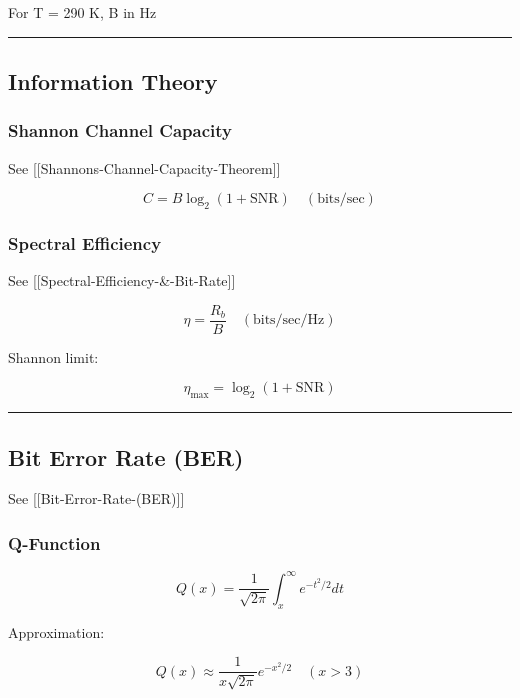 For T = 290 K, B in Hz

\begin{center}\rule{0.5\linewidth}{0.5pt}\end{center}

\subsection{\texorpdfstring{ Information
Theory}{ Information Theory}}\label{information-theory}

\subsubsection{Shannon Channel Capacity}\label{shannon-channel-capacity}

See {[}{[}Shannon\textquotesingle s-Channel-Capacity-Theorem{]}{]}

\[
C = B \log_2(1 + \text{SNR}) \quad (\text{bits/sec})
\]

\subsubsection{Spectral Efficiency}\label{spectral-efficiency}

See {[}{[}Spectral-Efficiency-\&-Bit-Rate{]}{]}

\[
\eta = \frac{R_b}{B} \quad (\text{bits/sec/Hz})
\]

Shannon limit:

\[
\eta_{\max} = \log_2(1 + \text{SNR})
\]

\begin{center}\rule{0.5\linewidth}{0.5pt}\end{center}

\subsection{\texorpdfstring{ Bit Error Rate
(BER)}{ Bit Error Rate (BER)}}\label{bit-error-rate-ber}

See {[}{[}Bit-Error-Rate-(BER){]}{]}

\subsubsection{Q-Function}\label{q-function}

\[
Q(x) = \frac{1}{\sqrt{2\pi}} \int_x^\infty e^{-t^2/2} dt
\]

Approximation:

\[
Q(x) \approx \frac{1}{x\sqrt{2\pi}} e^{-x^2/2} \quad (x > 3)
\]

